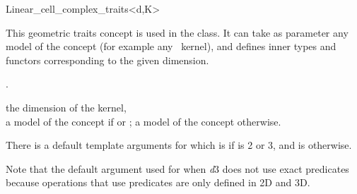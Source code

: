 \ccRefPageBegin

\begin{ccRefClass}{Linear_cell_complex_traits<d,K>}


\ccDefinition

This geometric traits concept is used in the
 class.  It can take as parameter any model of the
concept  (for example any \cgal\ kernel), and defines inner
types and functors corresponding to the given dimension.

\ccIsModel
{}

\ccInheritsFrom
{}.

\ccParameters
{} the dimension of the kernel,\\
 a model of the concept  if  or 
 ; a model of the concept  otherwise. 

There is a default template arguments for  which is
if  is 2 or 3, and is 
otherwise.

Note that the default argument used for  when
\emph{d}\mygt{}3 does not use exact predicates because operations that
use predicates are only defined in 2D and 3D.

\ccConstants
{}

\ccSeeAlso
{}

\end{ccRefClass}
\ccRefPageEnd
